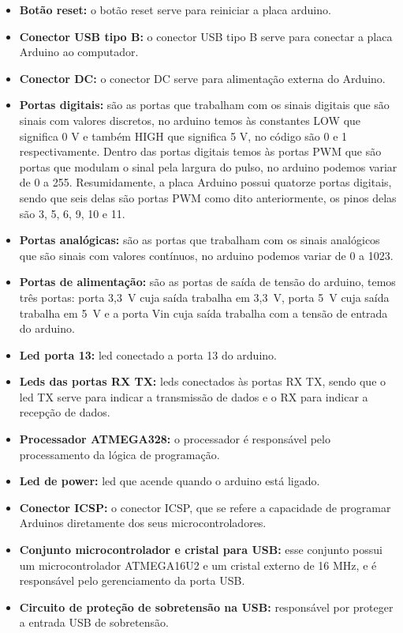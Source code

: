 \begin{itemize}
\item \textbf{Botão reset:} o botão reset serve para reiniciar a placa arduino.
\item \textbf{Conector \ac{USB} tipo B:} o conector \ac{USB} tipo B serve para conectar a placa Arduino ao computador.
\item \textbf{Conector DC:} o conector DC serve para alimentação externa do Arduino.
\item \textbf{Portas digitais:} são as portas que trabalham com os sinais digitais que são sinais com valores discretos, no arduino temos às constantes LOW que significa 0 V e também HIGH que significa 5 V, no código são 0 e 1 respectivamente. Dentro das portas digitais temos às portas \ac{PWM} que são portas que modulam o sinal pela largura do pulso, no arduino podemos variar de 0 a 255. Resumidamente, a placa Arduino possui quatorze portas digitais, sendo que seis delas são portas \ac{PWM} como dito anteriormente, os pinos delas são 3, 5, 6, 9, 10 e 11.
\item \textbf{Portas analógicas:} são as portas que trabalham com os sinais analógicos que são sinais com valores contínuos, no arduino podemos variar de 0 a 1023.
\item \textbf{Portas de alimentação:} são as portas de saída de tensão do arduino, temos três portas: porta 3,3~V cuja saída trabalha em 3,3~V, porta 5~V cuja saída trabalha em 5~V e a porta Vin cuja saída trabalha com a tensão de entrada do arduino.
\item \textbf{Led porta 13:} led conectado a porta 13 do arduino.
\item \textbf{Leds das portas RX TX:} leds conectados às portas RX TX, sendo que o led TX serve para indicar a transmissão de dados e o RX para indicar a recepção de dados.
\item \textbf{Processador ATMEGA328:} o processador é responsável pelo processamento da lógica de programação.
\item \textbf{Led de power:} led que acende quando o arduino está ligado.
\item \textbf{Conector \ac{ICSP}:} o conector \ac{ICSP}, que se refere a capacidade de programar Arduinos diretamente dos seus microcontroladores. 
\item \textbf{Conjunto microcontrolador e cristal para \ac{USB}:} esse conjunto possui um microcontrolador ATMEGA16U2 e um cristal externo de 16 MHz, e é responsável pelo gerenciamento da porta \ac{USB}.
\item \textbf{Circuito de proteção de sobretensão na \ac{USB}:} responsável por proteger a entrada \ac{USB} de sobretensão.

\end{itemize}
